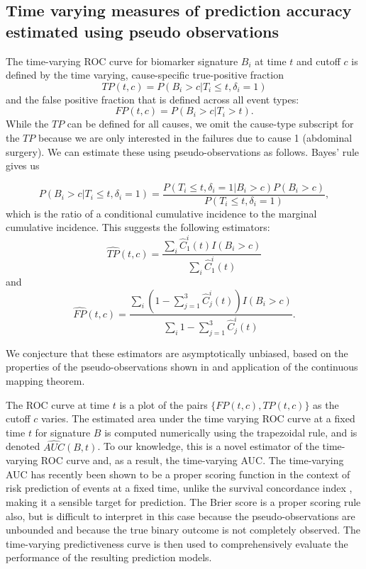 \documentclass{statsoc}
\begin{document}
\subsection{Time varying measures of prediction accuracy estimated using pseudo observations}

The time-varying ROC curve \citep{heagerty2000time,saha2010time} for biomarker signature $B_i$ at time $t$ and cutoff $c$ is defined by the time varying, cause-specific true-positive fraction 
\[
TP(t, c) = P(B_i > c | T_i \leq t, \delta_i = 1)
\]
and the false positive fraction that is defined across all event types: 
\[
FP(t, c) = P(B_i > c | T_i > t).
\]
While the $TP$ can be defined for all causes, we omit the cause-type subscript for the $TP$ because we are only interested in the failures due to cause 1 (abdominal surgery). We can estimate these using pseudo-observations as follows. Bayes' rule gives us 

\[
P(B_i > c | T_i \leq t, \delta_i = 1) = \frac{P(T_i \leq t, \delta_i = 1 | B_i > c) P(B_i > c)}{P(T_i \leq t, \delta_i = 1)},
\]
which is the ratio of a conditional cumulative incidence to the marginal cumulative incidence. This suggests the following estimators: 
\[
\widehat{TP}(t, c) = \frac{\sum_{i} \hat{C}^i_1(t) I(B_i > c)}{\sum_{i} \hat{C}^i_1(t)}
\]
and 
\[
\widehat{FP}(t, c) = \frac{\sum_{i} (1 - \sum_{j=1}^3\hat{C}^i_j(t)) I(B_i > c)}{\sum_{i} 1 - \sum_{j=1}^3\hat{C}^i_j(t)}.
\]

We conjecture that these estimators are asymptotically unbiased, based on the properties of the pseudo-observations shown in \citet{overgaard2017asymptotic} and application of the continuous mapping theorem. 

The ROC curve at time $t$ is a plot of the pairs $\{FP(t, c), TP(t, c)\}$ as the cutoff $c$ varies. The estimated area under the time varying ROC curve at a fixed time $t$ for signature $B$ is computed numerically using the trapezoidal rule, and is denoted $\widehat{AUC}(B, t)$. To our knowledge, this is a novel estimator of the time-varying ROC curve and, as a result, the time-varying AUC. The time-varying AUC has recently been shown to be a proper scoring function in the context of risk prediction of events at a fixed time, unlike the survival concordance index \citep{blanche2018c}, making it a sensible target for prediction. The Brier score is a proper scoring rule also, but is difficult to interpret in this case because the pseudo-observations are unbounded and because the true binary outcome is not completely observed. The time-varying predictiveness curve is then used to comprehensively evaluate the performance of the resulting prediction models.
\end{document}
